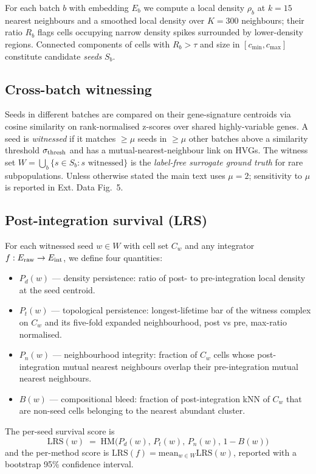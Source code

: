 For each batch $b$ with embedding $E_b$ we compute a local density $\rho_b$ at $k=15$ nearest neighbours and a smoothed local density over $K=300$ neighbours; their ratio $R_b$ flags cells occupying narrow density spikes surrounded by lower-density regions.  Connected components of cells with $R_b > \tau$ and size in $[c_{\min}, c_{\max}]$ constitute candidate \emph{seeds} $S_b$.

\subsection{Cross-batch witnessing}

Seeds in different batches are compared on their gene-signature centroids via cosine similarity on rank-normalised z-scores over shared highly-variable genes.  A seed is \emph{witnessed} if it matches $\ge \mu$ seeds in $\ge \mu$ other batches above a similarity threshold $\sigma_{\rm thresh}$ and has a mutual-nearest-neighbour link on HVGs.  The witness set $W = \bigcup_b \{s \in S_b : s \text{ witnessed}\}$ is the \emph{label-free surrogate ground truth} for rare subpopulations.  Unless otherwise stated the main text uses $\mu=2$; sensitivity to $\mu$ is reported in Ext. Data Fig.~5.

\subsection{Post-integration survival (LRS)}

For each witnessed seed $w \in W$ with cell set $C_w$ and any integrator $f:E_{\rm raw}\to E_{\rm int}$, we define four quantities:
\begin{itemize}[leftmargin=1.2em]
\item $P_d(w)$ --- density persistence: ratio of post- to pre-integration local density at the seed centroid.
\item $P_t(w)$ --- topological persistence: longest-lifetime bar of the witness complex on $C_w$ and its five-fold expanded neighbourhood, post vs pre, max-ratio normalised.
\item $P_n(w)$ --- neighbourhood integrity: fraction of $C_w$ cells whose post-integration mutual nearest neighbours overlap their pre-integration mutual nearest neighbours.
\item $B(w)$ --- compositional bleed: fraction of post-integration kNN of $C_w$ that are non-seed cells belonging to the nearest abundant cluster.
\end{itemize}
The per-seed survival score is
\[
\mathrm{LRS}(w) \;=\; \mathrm{HM}\!\bigl(P_d(w),\, P_t(w),\, P_n(w),\, 1-B(w)\bigr)
\]
and the per-method score is $\mathrm{LRS}(f) = \mathrm{mean}_{w \in W}\mathrm{LRS}(w)$, reported with a bootstrap 95\% confidence interval.

